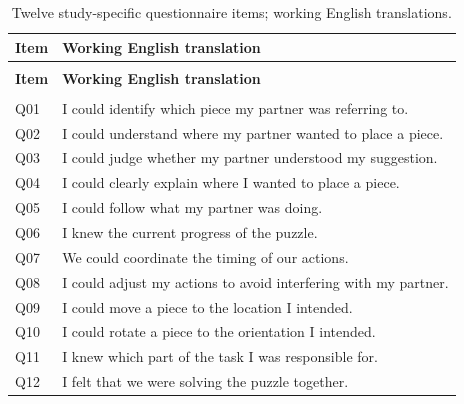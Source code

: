 \begingroup
{}
\fontsize{10}{12.3}\selectfont
\setlength{\tabcolsep}{2.2pt}
\renewcommand{\arraystretch}{1.18}
\begin{longtable}{@{}>{\raggedright\arraybackslash}p{14.855mm}>{\raggedright\arraybackslash}p{143.599mm}@{}}
\caption[Twelve study-specific questionnaire items; working English translations.]{Twelve study-specific questionnaire items; working English translations.}\label{tab:B-1}\\
\toprule
\textbf{Item} & \textbf{Working English translation} \\
\midrule
\endfirsthead
\multicolumn{2}{l}{\small\itshape Table \thetable{} (continued)}\\
\toprule
\textbf{Item} & \textbf{Working English translation} \\
\midrule
\endhead
\midrule
\multicolumn{2}{r}{\small Continued on next page}\\
\endfoot
\bottomrule
\endlastfoot
Q01 & I could identify which piece my partner was referring to. \\
\addlinespace[3pt]
Q02 & I could understand where my partner wanted to place a piece. \\
\addlinespace[3pt]
Q03 & I could judge whether my partner understood my suggestion. \\
\addlinespace[3pt]
Q04 & I could clearly explain where I wanted to place a piece. \\
\addlinespace[3pt]
Q05 & I could follow what my partner was doing. \\
\addlinespace[3pt]
Q06 & I knew the current progress of the puzzle. \\
\addlinespace[3pt]
Q07 & We could coordinate the timing of our actions. \\
\addlinespace[3pt]
Q08 & I could adjust my actions to avoid interfering with my partner. \\
\addlinespace[3pt]
Q09 & I could move a piece to the location I intended. \\
\addlinespace[3pt]
Q10 & I could rotate a piece to the orientation I intended. \\
\addlinespace[3pt]
Q11 & I knew which part of the task I was responsible for. \\
\addlinespace[3pt]
Q12 & I felt that we were solving the puzzle together. \\
\end{longtable}
\endgroup

